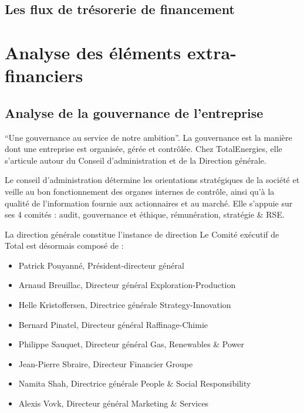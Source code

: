 \documentclass[12pt]{article}
\begin{document}
\subsection{Les flux de trésorerie de financement}

\newpage
\section{Analyse des éléments extra-financiers}
\subsection{Analyse de la gouvernance de l'entreprise}
“Une gouvernance au service de notre ambition”.
La gouvernance est la manière dont une entreprise est organisée, gérée et contrôlée. Chez TotalEnergies, elle s'articule autour du Conseil d'administration et de la Direction générale.

Le conseil d'administration détermine les orientations stratégiques de la société et veille au bon fonctionnement des organes internes de contrôle, ainsi qu'à la qualité de l'information fournie aux actionnaires et au marché. Elle s'appuie sur ses 4 comités : audit, gouvernance et éthique, rémunération, stratégie \& RSE.

La direction générale constitue l'instance de direction 
Le Comité exécutif de Total est désormais composé de :
\begin{itemize}
    \item Patrick Pouyanné, Président-directeur général
    \item Arnaud Breuillac, Directeur général Exploration-Production
    \item Helle Kristoffersen, Directrice générale Strategy-Innovation
    \item Bernard Pinatel, Directeur général Raffinage-Chimie
    \item Philippe Sauquet, Directeur général Gas, Renewables \& Power
    \item Jean-Pierre Sbraire, Directeur Financier Groupe
    \item Namita Shah, Directrice générale People \& Social Responsibility
    \item Alexis Vovk, Directeur général Marketing \& Services
\end{itemize}
\end{document}
